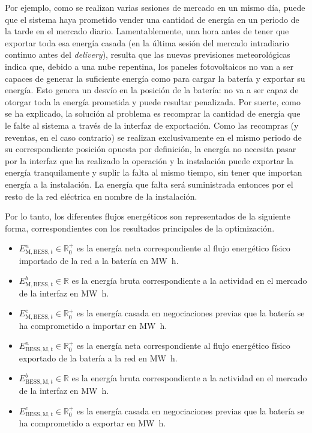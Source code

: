 Por ejemplo, como se realizan varias sesiones de mercado en un mismo día, puede que el sistema haya prometido vender una cantidad de energía en un periodo de la tarde en el mercado diario. Lamentablemente, una hora antes de tener que exportar toda esa energía casada (en la última sesión del mercado intradiario continuo antes del \textit{delivery}), resulta que las nuevas previsiones meteorológicas indica que, debido a una nube repentina, los paneles fotovoltaicos no van a ser capaces de generar la suficiente energía como para cargar la batería y exportar su energía. Esto genera un desvío en la posición de la batería: no va a ser capaz de otorgar toda la energía prometida y puede resultar penalizada. Por suerte, como se ha explicado, la solución al problema es recomprar la cantidad de energía que le falte al sistema a través de la interfaz de exportación. Como las recompras (y reventas, en el caso contrario) se realizan exclusivamente en el mismo periodo de su correspondiente posición opuesta por definición, la energía no necesita pasar por la interfaz que ha realizado la operación y la instalación puede exportar la energía tranquilamente y suplir la falta al mismo tiempo, sin tener que importan energía a la instalación. La energía que falta será suministrada entonces por el resto de la red eléctrica en nombre de la instalación.

Por lo tanto, los diferentes flujos energéticos son representados de la siguiente forma, correspondientes con los resultados principales de la optimización.

\begin{itemize}

  \item \( E^{n}_{\text{M}, \text{BESS}, t} \in \mathbb{R}^{+}_{0} \) es la energía neta correspondiente al flujo energético físico importado de la red a la batería en \si{{\mega\watt\hour}}.

  \item \( E^{b}_{\text{M}, \text{BESS}, t} \in \mathbb{R} \) es la energía bruta correspondiente a la actividad en el mercado de la interfaz en \si{{\mega\watt\hour}}.

  \item \( E^{c}_{\text{M}, \text{BESS}, t} \in \mathbb{R}^{+}_{0} \) es la energía casada en negociaciones previas que la batería se ha comprometido a importar en \si{{\mega\watt\hour}}.

  \item \( E^{n}_{\text{BESS}, \text{M}, t} \in \mathbb{R}^{+}_{0} \) es la energía neta correspondiente al flujo energético físico exportado de la batería a la red en \si{{\mega\watt\hour}}.

  \item \( E^{b}_{\text{BESS}, \text{M}, t} \in \mathbb{R} \) es la energía bruta correspondiente a la actividad en el mercado de la interfaz en \si{{\mega\watt\hour}}.

  \item \( E^{c}_{\text{BESS}, \text{M}, t} \in \mathbb{R}^{+}_{0} \) es la energía casada en negociaciones previas que la batería se ha comprometido a exportar en \si{{\mega\watt\hour}}.

\end{itemize}

